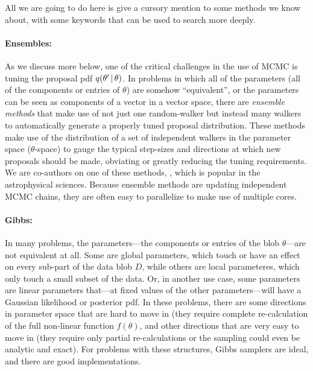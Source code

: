 \documentclass[12pt,twoside,pdftex]{article}
\newcommand{\data}{D}
\newcommand{\pars}{\theta}
\begin{document}
All we are going to do here is give a cursory mention to some methods
we know about, with some keywords that can be used to search more
deeply.

%
%


\paragraph{Ensembles:}
As we discuss more below, one of the critical challenges in the use of
MCMC is tuning the proposal pdf $q(\pars'\given\pars)$.
In problems in which all of the parameters (all of the components or entries of $\pars$) are somehow ``equivalent'',
or the parameters can be seen as components of a vector in a vector
space, there are \emph{ensemble methods} that make use of not just one
random-walker but instead many walkers to automatically generate a properly tuned
proposal distribution.
These methods make use of the distribution of a set of independent
walkers in the parameter space ($\pars$-space) to gauge the typical step-sizes and
directions at which new proposals should be made, obviating or greatly
reducing the tuning requirements.
We are co-authors on one of these methods, , which is popular in the astrophysical sciences.
Because ensemble methods are updating independent MCMC chains, they
are often easy to parallelize to make use of multiple cores.

\paragraph{Gibbs:}
In many problems, the parameters---the components or entries of the
blob $\pars$---are not equivalent at all.
Some are global parameters, which touch or have an effect on every
sub-part of the data blob $\data$, while others are local parameteres,
which only touch a small subset of the data.
Or, in another use case, some parameters are linear parameters
that---at fixed values of the other parameters---will have a Gaussian
likelihood or posterior pdf.
In these problems, there are some directions in parameter space that
are hard to move in (they require complete re-calculation of the full
non-linear function $f(\pars)$, and other directions that are very
easy to move in (they require only partial re-calculations or the
sampling could even be analytic and exact).
For problems with these structures, Gibbs samplers are ideal, and
there are good implementations.
\end{document}
